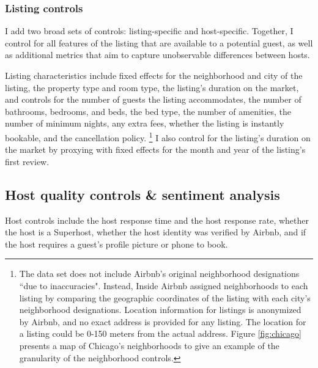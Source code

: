\subsubsection*{Listing controls} 



I add two broad sets of controls: listing-specific and host-specific. Together, I control for all features of the listing that are available to a potential guest, as well as additional metrics that aim to capture unobservable differences between hosts. 

Listing characteristics include fixed effects for the neighborhood and city of the listing, the property type and room type, the listing's duration on the market, and controls for the number of guests the listing accommodates, the number of bathrooms, bedrooms, and beds, the bed type, the number of amenities, the number of minimum nights, any extra fees, whether the listing is instantly bookable, and the cancellation policy.%
\footnote{The data set does not include Airbnb's original neighborhood designations ``due to inaccuracies". Instead, Inside Airbnb assigned neighborhoods to each listing by comparing the geographic coordinates of the listing with each city's neighborhood designations. Location information for listings is anonymized by Airbnb, and no exact address is provided for any listing. The location for a listing could be 0-150 meters from the actual address. Figure \ref{fig:chicago} presents a map of Chicago's neighborhoods to give an example of the granularity of the neighborhood controls.}
I also control for the listing's duration on the market by proxying with fixed effects for the month and year of the listing's first review.


\subsection*{Host quality controls  \& sentiment analysis}
Host controls include the host response time and the host response rate, whether the host is a Superhost, whether the host identity was verified by Airbnb, and if the host requires a guest's profile picture or phone to book. 

